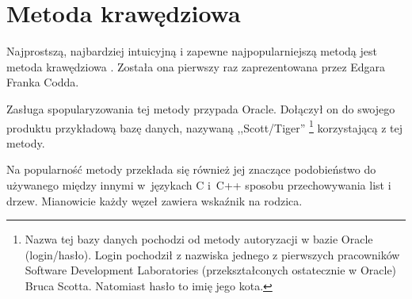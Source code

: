 \section{Metoda krawędziowa}








Najprostszą, najbardziej intuicyjną i zapewne najpopularniejszą metodą jest metoda krawędziowa .
Została ona pierwszy raz zaprezentowana przez Edgara Franka Codda.


Zasługa spopularyzowania tej metody przypada Oracle.
Dołączył on do swojego produktu przykładową bazę danych, nazywaną ,,Scott/Tiger'' 
\footnote{
    Nazwa tej bazy danych pochodzi od metody autoryzacji w bazie Oracle (login/hasło).
    Login pochodził z nazwiska jednego z pierwszych pracowników 
    Software Development Laboratories (przekształconych ostatecznie w Oracle)
    Bruca Scotta. 
    Natomiast hasło to imię jego kota.
}
korzystającą z tej metody.

Na popularność metody przekłada się również jej znaczące podobieństwo do 
używanego między innymi w~językach C i~C++ sposobu przechowywania list i drzew.
Mianowicie każdy węzeł zawiera wskaźnik na rodzica.

